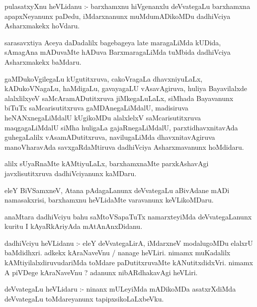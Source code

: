 \documentclass{article}
\begin{document}
\begin{mn}
pulasatxyXnu  heVLidanu :- barxhamxnu  hiVgenanxlu  deVvategaLu  barxhamxna  
apapxNeyanunx  paDedu,  iMdarxnanunx  muMdumADikoMDu  dadhiVciya  Asharxmakekx  hoVdaru. 
\end{mn}

\begin{mn}
sarasavxtiya  Aceya  daDadalilx  bagebageya  late  maragaLiMda  kUDida,  sAmagAna  
mADuvaMte  hADuva  BarxmaragaLiMda  tuMbida  dadhiVciya  Asharxmakekx  baMdaru.
\end{mn}

\begin{mn}
gaMDukoVgilegaLu  kUgutitxruva,  cakoVragaLa  dhavxniyuLaLx,  kADukoVNagaLu,  
haMdigaLu,  gavayagaLU  vAsavAgiruva,  huliya  Bayavilalxde  alalxlilxyeV  
saMcAramADutitxruva  jiMkegaLuLaLx,  siMhada  Bayavanunx  biTuTx  saMcarisutitxruva  
gaMDAnegaLiMdalU,  madisiruva  heNANxnegaLiMdalU  kUgikoMDu  alalxlelxV  
saMcarisutitxruva  maqgagaLiMdalU  siMha  huligaLa  gajaRnegaLiMdalU,  
parxtidhavxnitavAda  guhegaLalilx  vAsamADutitxruva,  navilugaLiMda  
dhavxnitavAgiruva  manoVharavAda  savxgaRdaMtiruva  dadhiVciya  Asharxmavanunx  hoMdidaru.
\end{mn}

\begin{mn}
alilx  sUyaRnaMte  kAMtiyuLaLx,  barxhamxnaMte  parxkAshavAgi  javxlisutitxruva  
dadhiVciyanunx  kaMDaru.
\end{mn}

\begin{mn}
eleY  BiVSamxneV,  Atana  pAdagaLanunx  deVvategaLu  aBivAdane mADi  namasakxrisi,  
barxhamxnu  heVLidaMte  varavanunx  keVLikoMDaru.
\end{mn}

\begin{mn}
anaMtara  dadhiVciyu  bahu  saMtoVSapaTuTx  namarxteyiMda  deVvategaLanunx  kuritu  
I  kAyaRkAriyAda  mAtAnAnxDidanu.
\end{mn}

\begin{mn}
dadhiVciyu  heVLidanu :- eleY  deVvategaLirA,  iMdarxneV  modalugoMDu  elalxrU  
baMdidhxri.  adkekx  kAraNaveVnu /  nanage  heVLiri.  nimamx  muKadalilx  
kAMtiyilalxdiruvudariMda  toMdare paDutitxruvaMte  kANutitxdidxVri.  nimamx  
A piVDege  kAraNaveVnu ?  adanunx  nibARdhakavAgi  heVLiri.
\end{mn}

\begin{mn}
deVvategaLu  heVLidaru :- ninanx  mULeyiMda  mADikoMDa  asatxrXdiMda  deVvategaLu  
toMdareyanunx  tapipxsikoLaLxbeVku. 
\end{mn}
\end{document}
